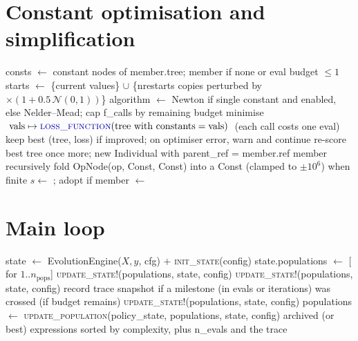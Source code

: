 \documentclass[11pt]{article}
\newcommand{\slot}[1]{\textcolor{blue!70!black}{\textsc{#1}}}
\newcommand{\cmt}[1]{\Comment{\textit{#1}}}
\begin{document}
\section*{Constant optimisation and simplification}
\begin{algorithmic}[1]
  \State consts $\gets$ constant nodes of member.tree; \Return member if none or eval budget $\le 1$
  \State starts $\gets$ \{current values\} $\cup$ \{nrestarts copies perturbed by $\times(1 + 0.5\,\mathcal N(0,1))$\}
  \State algorithm $\gets$ Newton if single constant and enabled, else Nelder--Mead; cap f\_calls by remaining budget
    \State minimise $\;\text{vals} \mapsto \slot{loss\_function}(\text{tree with constants} = \text{vals})\;$ (each call costs one eval)
    \State keep best (tree, loss) if improved; on optimiser error, warn and continue
  \EndFor
   re-score best tree once more; \Return new Individual with parent\_ref = member.ref \EndIf
  \State \Return member
\EndFunction
{}
  \State recursively fold OpNode(op, Const, Const) into a Const (clamped to $\pm10^6$) when finite
\EndFunction
{}
     $s \gets$ ; adopt if  \EndIf
     member $\gets$  \EndIf
  \EndFor
\EndFunction
\end{algorithmic}

\section*{Main loop}
\begin{algorithmic}[1]
  \State state $\gets$ EvolutionEngine($X, y$, cfg) $+$ \slot{init\_state}(config)
  \State state.populations $\gets$ [ for $1..n_{\text{pops}}$]
  \State \slot{update\_state!}(populations, state, config)
        \State \slot{update\_state!}(populations, state, config)
        \State {}
        \State record trace snapshot if a milestone (in evals or iterations) was crossed
      \EndFor
      \State {} \quad (if budget remains)
      \State \slot{update\_state!}(populations, state, config)
      \State populations $\gets$ \slot{update\_population}(policy\_state, populations, state, config) \cmt{e.g.\ migration, archive}
    \EndFor
  \EndFor
  \State \Return archived (or best) expressions sorted by complexity, plus n\_evals and the trace
\EndFunction
\end{algorithmic}
\end{document}
